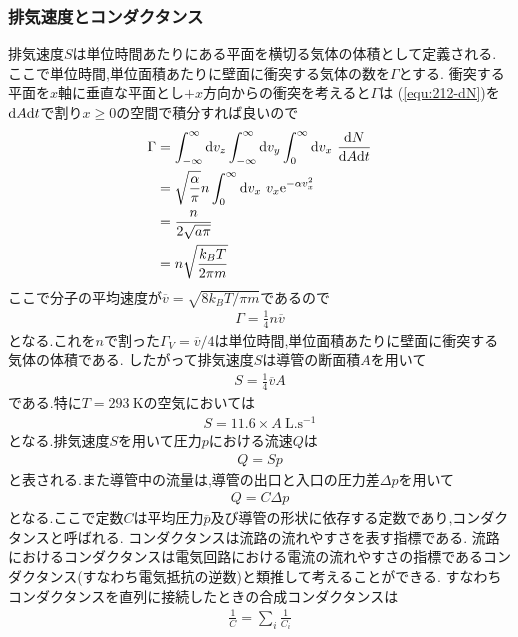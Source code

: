 \subsubsection{排気速度とコンダクタンス}
排気速度$S$は単位時間あたりにある平面を横切る気体の体積として定義される.
ここで単位時間,単位面積あたりに壁面に衝突する気体の数を$\Gamma$とする.
衝突する平面を$x$軸に垂直な平面とし$+x$方向からの衝突を考えると$\Gamma$は
(\ref{equ:212-dN})を${\rm d}A{\rm d}t$で割り$x\geq 0$の空間で積分すれば良いので
\begin{align}
  \begin{split}
    \Gamma&=\int_{-\infty}^\infty{\rm d}v_z\int_{-\infty}^\infty{\rm d}v_y\int_{0}^\infty{\rm d}v_x\ \frac{{\rm d}N}{{\rm d}A{\rm d}t}\\
    &=\sqrt{\frac{\alpha}{\pi}}n\int_0^{\infty}{\rm d}v_x\ v_x{\rm e}^{-\alpha v_x^2}\\
    &=\frac{n}{2\sqrt{a\pi}}\\
    &=n\sqrt{\frac{k_BT}{2\pi m}}
  \end{split}
\end{align}
ここで分子の平均速度が$\overline{v}=\sqrt{8k_BT/\pi m}$であるので
\begin{align}
  \Gamma=\frac{1}{4}n\overline{v}
\end{align}
となる.これを$n$で割った$\Gamma_V=\overline{v}/4$は単位時間,単位面積あたりに壁面に衝突する気体の体積である.
したがって排気速度$S$は導管の断面積$A$を用いて
\begin{align}
  S=\frac{1}{4}\overline{v}A
\end{align}
である.特に$T=293\ \si{\kelvin}$の空気においては
\begin{align}
  S=11.6\times A\ \si{\liter.\second^{-1}}
\end{align}
となる.排気速度$S$を用いて圧力$p$における流速$Q$は
\begin{align}
  Q=Sp
\end{align}
と表される.また導管中の流量は,導管の出口と入口の圧力差$\Delta p$を用いて
\begin{align}
  Q=C\Delta p
\end{align}
となる.ここで定数$C$は平均圧力$\overline{p}$及び導管の形状に依存する定数であり,コンダクタンスと呼ばれる.
コンダクタンスは流路の流れやすさを表す指標である.
流路におけるコンダクタンスは電気回路における電流の流れやすさの指標であるコンダクタンス(すなわち電気抵抗の逆数)と類推して考えることができる.
すなわちコンダクタンスを直列に接続したときの合成コンダクタンスは
\begin{align}
  \label{equ:215-heiretu}
  \frac{1}{C}=\sum_i\frac{1}{C_i}
\end{align}

